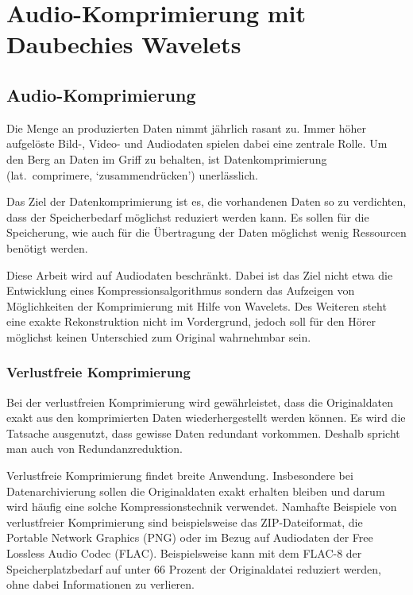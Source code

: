 %
%
%
\chapter{Audio-Komprimierung mit Daubechies Wavelets\label{chapter:compress}}
\begin{refsection}

\section{Audio-Komprimierung}
Die Menge an produzierten Daten nimmt jährlich rasant zu.
Immer höher aufgelöste Bild-, Video- und Audiodaten spielen dabei eine zentrale Rolle.
Um den Berg an Daten im Griff zu behalten, ist Datenkomprimierung (lat.~comprimere, `zusammendrücken') unerlässlich. 

Das Ziel der Datenkomprimierung ist es, die vorhandenen Daten so zu verdichten, dass der Speicherbedarf möglichst reduziert werden kann.
Es sollen für die Speicherung, wie auch für die Übertragung der Daten möglichst wenig Ressourcen benötigt werden.

Diese Arbeit wird auf Audiodaten beschränkt.
Dabei ist das Ziel nicht etwa die Entwicklung eines Kompressionsalgorithmus sondern das Aufzeigen von Möglichkeiten der Komprimierung mit Hilfe von Wavelets.
Des Weiteren steht eine exakte Rekonstruktion nicht im Vordergrund, jedoch soll für den Hörer möglichst keinen Unterschied zum Original wahrnehmbar sein.

\subsection{Verlustfreie Komprimierung}
Bei der verlustfreien Komprimierung wird gewährleistet, dass die Originaldaten exakt aus den komprimierten Daten wiederhergestellt werden können.
Es wird die Tatsache ausgenutzt, dass gewisse Daten redundant vorkommen. 
Deshalb spricht man auch von Redundanzreduktion.

Verlustfreie Komprimierung findet breite Anwendung.
Insbesondere bei Datenarchivierung sollen die Originaldaten exakt erhalten bleiben und darum wird häufig eine solche Kompressionstechnik verwendet.
Namhafte Beispiele von verlustfreier Komprimierung sind beispielsweise das ZIP-Dateiformat, die Portable Network Graphics (PNG) oder im Bezug auf Audiodaten der Free Lossless Audio Codec (FLAC).
Beispielsweise kann mit dem FLAC-8 der Speicherplatzbedarf auf unter 66 Prozent der Originaldatei reduziert werden, ohne dabei Informationen zu verlieren.\cite{wikipedia:flac}


\end{refsection}
